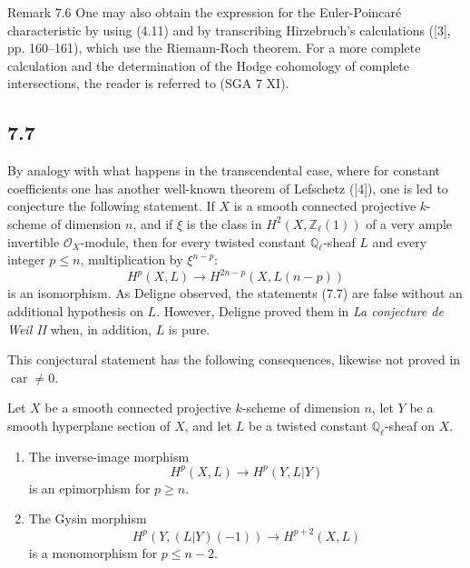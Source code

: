 \begin{statement}{Remark 7.6}
One may also obtain the expression for the Euler-Poincaré characteristic by using (4.11) and by transcribing Hirzebruch's calculations ([3], pp. 160--161), which use the Riemann-Roch theorem. For a more complete calculation and the determination of the Hodge cohomology of complete intersections, the reader is referred to (SGA 7 XI).
\end{statement}

\subsection*{7.7}

By analogy with what happens in the transcendental case, where for constant coefficients one has another well-known theorem of Lefschetz ([4]), one is led to conjecture the following statement. If $X$ is a smooth connected projective $k$-scheme of dimension $n$, and if $\xi$ is the class in $H^2(X,\mathbb Z_\ell(1))$ of a very ample invertible $\mathcal O_X$-module, then for every twisted constant $\mathbb Q_\ell$-sheaf $L$ and every integer $p\le n$, multiplication by $\xi^{n-p}$:
\[
H^p(X,L)\to H^{2n-p}(X,L(n-p))
\]
is an isomorphism. As Deligne observed, the statements (7.7) are false without an additional hypothesis on $L$. However, Deligne proved them in \emph{La conjecture de Weil II} when, in addition, $L$ is pure.

This conjectural statement has the following consequences, likewise not proved in $\operatorname{car}\ne0$.

Let $X$ be a smooth connected projective $k$-scheme of dimension $n$, let $Y$ be a smooth hyperplane section of $X$, and let $L$ be a twisted constant $\mathbb Q_\ell$-sheaf on $X$.
\begin{enumerate}[label=(\roman*)]
\item The inverse-image morphism
\[
H^p(X,L)\to H^p(Y,L|Y)
\]
is an epimorphism for $p\ge n$.
\item The Gysin morphism
\[
H^p(Y,(L|Y)(-1))\to H^{p+2}(X,L)
\]
is a monomorphism for $p\le n-2$.
\end{enumerate}

